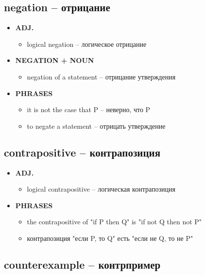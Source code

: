\documentclass[a4paper, 10pt]{article}
\theoremstyle{definition}
\theoremstyle{plain}
\theoremstyle{remark}
\begin{document}
\subsection{negation – отрицание}

\begin{itemize}
    \item \textbf{ADJ.}
    \begin{itemize}
        \item logical negation – логическое отрицание
    \end{itemize}
    
    \item \textbf{NEGATION + NOUN}
    \begin{itemize}
        \item negation of a statement – отрицание утверждения
    \end{itemize}
    
    \item \textbf{PHRASES}
    \begin{itemize}
        \item it is not the case that P – неверно, что P
        \item to negate a statement – отрицать утверждение
    \end{itemize}
\end{itemize}

\subsection{contrapositive – контрапозиция}

\begin{itemize}
    \item \textbf{ADJ.}
    \begin{itemize}
        \item logical contrapositive – логическая контрапозиция
    \end{itemize}
    
    \item \textbf{PHRASES}
    \begin{itemize}
        \item the contrapositive of "if P then Q" is "if not Q then not P"
        \item контрапозиция "если P, то Q" есть "если не Q, то не P"
    \end{itemize}
\end{itemize}

\subsection{counterexample – контрпример}
\end{document}
